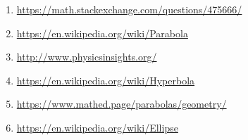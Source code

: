 \documentclass[12pt]{article}
\theoremstyle{definition}
\begin{document}

\begin{enumerate}
\item \url{https://math.stackexchange.com/questions/475666/}
\item \url{https://en.wikipedia.org/wiki/Parabola}
\item \url{http://www.physicsinsights.org/}
\item \url{https://en.wikipedia.org/wiki/Hyperbola}
\item \url{https://www.mathed.page/parabolas/geometry/}
\item \url{https://en.wikipedia.org/wiki/Ellipse}
\end{enumerate}

\printbibliography[heading=none]
\end{document}
